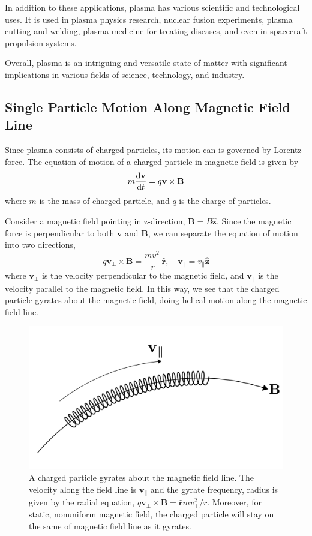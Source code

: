In addition to these applications, plasma has various scientific and technological uses. 
It is used in plasma physics research, nuclear fusion experiments, plasma cutting and welding, plasma medicine for treating diseases, and even in spacecraft propulsion systems.

Overall, plasma is an intriguing and versatile state of matter with significant implications in various fields of science, technology, and industry.

\subsection{Single Particle Motion Along Magnetic Field Line}
Since plasma consists of charged particles, its motion can is governed by Lorentz force. The equation of motion of a charged particle in magnetic field is given by
\[ m\dv{\mathbf{v}}{t} = q\mathbf{v\times B} \]
where $m$ is the mass of charged particle, and $q$ is the charge of particles.

Consider a magnetic field pointing in z-direction, $\mathbf{B}=B\mathbf{\hat{z}}$. Since the magnetic force is perpendicular to both $\mathbf{v}$ and $\mathbf{B}$, we can separate the equation of motion into two directions,
\[ 
q\mathbf{v_{\perp}\times B} = \frac{mv_{\perp}^2}{r}\mathbf{\hat{r}}, 
\quad
\mathbf{v}_{\parallel} = v_{\parallel} \mathbf{\hat{z}} \]
where $\mathbf{v}_{\perp}$ is the velocity perpendicular to the magnetic field, and $\mathbf{v}_{\parallel}$ is the velocity parallel to the magnetic field. In this way, we see that the charged particle gyrates about the magnetic field, doing helical motion along the magnetic field line. 

\begin{figure}[htbp]
	\centering
	\includegraphics[width=0.7\linewidth]{img/governing-equations/gyrate-along-b-field}
	\caption{A charged particle gyrates about the magnetic field line. The velocity along the field line is $\mathbf{v}_{\parallel}$ and the gyrate frequency, radius is given by the radial equation, $q\mathbf{v_{\perp}\times B} = \mathbf{\hat{r}} mv_\perp^2/r$. Moreover, for static, nonuniform magnetic field, the charged particle will stay on the same of magnetic field line as it gyrates.}
	\label{fig:gyrate-along-b-field}
\end{figure}

